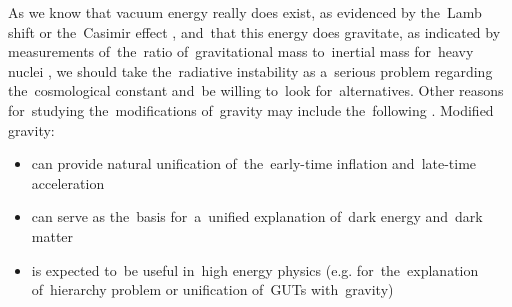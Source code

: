 As we know that vacuum energy really does exist, as evidenced by the~Lamb shift \parencite{2020Physi...2..105M} or the~Casimir effect \parencite{2006BrJPh..36.1137F}, and~that this energy does gravitate, as indicated by measurements of~the~ratio of~gravitational mass to~inertial mass for~heavy nuclei \parencite{Braginskii:1971tn}, we should take the~radiative instability as a~serious problem regarding the~cosmological constant and~be willing to~look for~alternatives. Other reasons for~studying the~modifications of~gravity may include the~following \parencite{2006hep.th....1213N}. Modified gravity:
\begin{itemize}
	\item can provide natural unification of~the~early-time inflation and~late-time acceleration
	\item can serve as the~basis for~a~unified explanation of~dark energy and~dark matter
	\item is expected to~be useful in~high energy physics (e.g. for~the~explanation of~hierarchy problem or unification of~GUTs with~gravity)
\end{itemize}